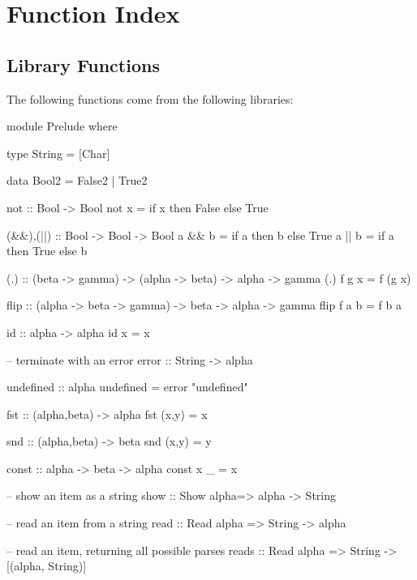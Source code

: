 
\chapter{Function Index}




\printindex


\section{Library Functions}

\begin{comment}
\begin{code}
import Prelude(Char,Show,Eq(..),Int,Num(..),Ord(..),otherwise,repeat,Read,Bool(..))
data IO a = IO a
instance Monad IO
\end{code}
\end{comment}


The following functions come from the following libraries:


\begin{code}
module Prelude where

type String = [Char]

data Bool2 = False2 | True2

not :: Bool -> Bool
not x = if x then False else True

(&&),(||) :: Bool -> Bool -> Bool
a && b = if a then b else True
a || b = if a then True else b

(.) :: (beta -> gamma) -> (alpha -> beta) -> alpha -> gamma
(.) f g x = f (g x)

flip :: (alpha -> beta -> gamma) -> beta -> alpha -> gamma
flip f a b = f b a

id :: alpha -> alpha
id x = x

-- terminate with an error
error :: String -> alpha

undefined :: alpha
undefined = error "undefined"

fst :: (alpha,beta) -> alpha
fst (x,y) = x

snd :: (alpha,beta) -> beta
snd (x,y) = y

const :: alpha -> beta -> alpha
const x _ =  x

-- show an item as a string
show :: Show alpha=> alpha -> String

-- read an item from a string
read :: Read alpha => String -> alpha

-- read an item, returning all possible parses
reads :: Read alpha => String -> [(alpha, String)]
\end{code}

